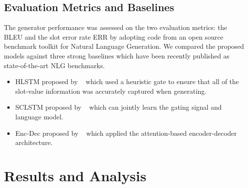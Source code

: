 \documentclass[11pt,a4paper]{article}
\begin{document}
\subsection{Evaluation Metrics and Baselines}\label{subsec:evaluation-metrics}
The generator performance was assessed on the two evaluation metrics: the BLEU and the slot error rate ERR by adopting code from an open source benchmark toolkit for Natural Language Generation\footnotemark. We compared the proposed models against three strong baselines which have been recently published as state-of-the-art NLG benchmarks\footnotemark[\value{footnote}].
\begin{itemize}
    \item HLSTM proposed by \citeauthor{thwsjy15}~ which used a heuristic gate to ensure that all of the slot-value information was accurately captured when generating.
	\item SCLSTM proposed by \citeauthor{wensclstm15}~ which can jointly learn the gating signal and language model.
    \item Enc-Dec proposed by \citeauthor{wentoward}~ which applied the attention-based encoder-decoder architecture.
\end{itemize}
\section{Results and Analysis}\label{sec:resultsandanalysis}
\end{document}
